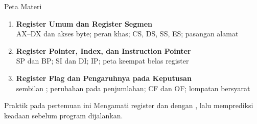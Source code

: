 \documentclass[aspectratio=169,11pt]{beamer}
\begin{document}
\begin{frame}{Peta Materi}
\small
\begin{enumerate}
    \item \textbf{Register Umum dan Register Segmen}\\
          {\footnotesize AX--DX dan akses byte; peran khas; CS, DS,
          SS, ES; pasangan alamat}

    \vspace{0.25em}
    \item \textbf{Register Pointer, Index, dan Instruction Pointer}\\
          {\footnotesize SP dan BP; SI dan DI; IP; peta keempat belas
          register}

    \vspace{0.25em}
    \item \textbf{Register Flag dan Pengaruhnya pada Keputusan}\\
          {\footnotesize sembilan ; perubahan pada
          penjumlahan; CF dan OF; lompatan bersyarat}
\end{enumerate}

\vspace{0.35em}
\begin{block}{Praktik pada pertemuan ini}
\small Mengamati register dan  dengan ,
lalu memprediksi keadaan  sebelum program dijalankan.
\end{block}
\end{frame}

\end{document}
